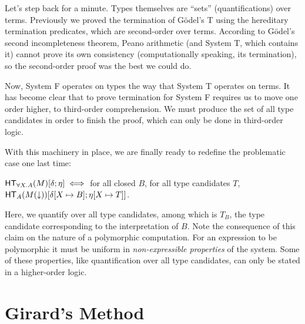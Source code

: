 \documentclass{article}
\begin{document}



Let's step back for a minute. Types themselves are ``sets'' (quantifications) over terms.
Previously we proved the termination of G\"odel's T using the hereditary termination predicates,
which are second-order over terms. According to G\"odel's second incompleteness theorem, Peano
arithmetic (and System T, which contains it) cannot prove its own consistency (computationally
speaking, its termination), so the second-order proof was the best we could do.

Now, System F operates on types the way that System T operates on terms. It has become clear that
to prove termination for System F requires us to move one order higher, to third-order comprehension.
We must produce the set of all type candidates in order to finish the proof, which can only be
done in third-order logic.

With this machinery in place, we are finally ready to redefine the problematic case one last time:

$\mathsf{HT}_{\forall X. A}(M)[\delta;\eta] \iff $ for all closed $B$, for all type candidates $T$,
$\mathsf{HT}_{A}(M(\downarrow))[\delta[X \mapsto B];\eta[X \mapsto T]]$.

Here, we quantify over all type candidates, among which is $T_B$, the type candidate corresponding
to the interpretation of $B$. Note the consequence of this claim on the nature of a polymorphic
computation. For an expression to be polymorphic it must be uniform in \emph{non-expressible properties}
of the system. Some of these properties, like quantification over all type candidates, can only
be stated in a higher-order logic.

\section{Girard's Method}
\end{document}
